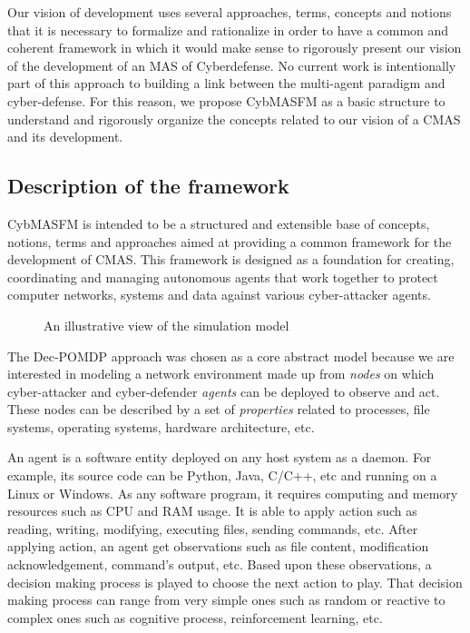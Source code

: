 \documentclass[conference]{IEEEtran}
\begin{document}
Our vision of development uses several approaches, terms, concepts and notions that it is necessary to formalize and rationalize in order to have a common and coherent framework in which it would make sense to rigorously present our vision of the development of an MAS of Cyberdefense. No current work is intentionally part of this approach to building a link between the multi-agent paradigm and cyber-defense. For this reason, we propose CybMASFM as a basic structure to understand and rigorously organize the concepts related to our vision of a CMAS and its development.

\subsection{Description of the framework}

CybMASFM is intended to be a structured and extensible base of concepts, notions, terms and approaches aimed at providing a common framework for the development of CMAS. This framework is designed as a foundation for creating, coordinating and managing autonomous agents that work together to protect computer networks, systems and data against various cyber-attacker agents.

\begin{figure*}[]
    \centering
    
    \caption{An illustrative view of the simulation model}
    \label{fig:model_example_illustration}
\end{figure*}

The Dec-POMDP approach was chosen as a core abstract model because we are interested in modeling a network environment made up from \textit{nodes} on which cyber-attacker and cyber-defender \textit{agents} can be deployed to observe and act. These nodes can be described by a set of \textit{properties} related to processes, file systems, operating systems, hardware architecture, etc.

An agent is a software entity deployed on any host system as a daemon.
For example, its source code can be Python, Java, C/C++, etc and running on a Linux or Windows.
As any software program, it requires computing and memory resources such as CPU and RAM usage.
It is able to apply action such as reading, writing, modifying, executing files, sending commands, etc.
After applying action, an agent get observations such as file content, modification acknowledgement, command's output, etc.
Based upon these observations, a decision making process is played to choose the next action to play. That decision making process can range from very simple ones such as random or reactive to complex ones such as cognitive process, reinforcement learning, etc.
\end{document}
